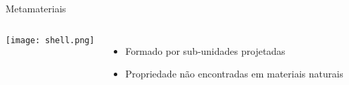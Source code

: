 \begin{frame}[t]{Metamateriais}
    \transboxout[duration=0.5]
    \begin{columns}
            \texttt{[image: shell.png]}
            \begin{itemize}
                \item Formado por sub-unidades projetadas
                \item Propriedade não encontradas em materiais naturais
            
            \end{itemize}
    \end{columns}
    
\end{frame}